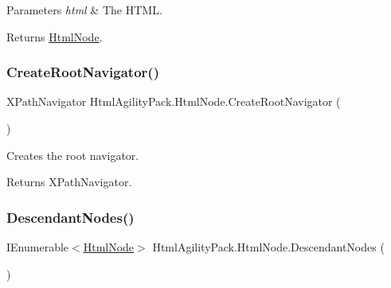 \begin{DoxyParams}{Parameters}
{\em html} & The H\+T\+ML.\\
\hline
\end{DoxyParams}
\begin{DoxyReturn}{Returns}
\hyperlink{class_html_agility_pack_1_1_html_node}{Html\+Node}.
\end{DoxyReturn}
\mbox{\label{class_html_agility_pack_1_1_html_node_a48e03390c9e95693348e402fcb58ce45}} 
\subsubsection{\texorpdfstring{Create\+Root\+Navigator()}{CreateRootNavigator()}}
{\footnotesize\ttfamily X\+Path\+Navigator Html\+Agility\+Pack.\+Html\+Node.\+Create\+Root\+Navigator (\begin{DoxyParamCaption}{ }\end{DoxyParamCaption})\hspace{0.3cm}{\ttfamily [inline]}}



Creates the root navigator. 

\begin{DoxyReturn}{Returns}
X\+Path\+Navigator.
\end{DoxyReturn}
\mbox{\label{class_html_agility_pack_1_1_html_node_aa709d57b50278e281891ee7ad56dda2a}} 
\subsubsection{\texorpdfstring{Descendant\+Nodes()}{DescendantNodes()}}
{\footnotesize\ttfamily I\+Enumerable$<$\hyperlink{class_html_agility_pack_1_1_html_node}{Html\+Node}$>$ Html\+Agility\+Pack.\+Html\+Node.\+Descendant\+Nodes (\begin{DoxyParamCaption}{ }\end{DoxyParamCaption})\hspace{0.3cm}{\ttfamily [inline]}}



